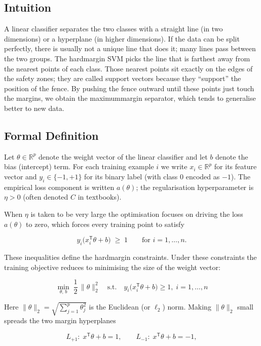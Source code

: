 \documentclass[12pt, a4paper]{article}
\begin{document}
\subsection{Intuition}
A linear classifier separates the two classes with a straight line (in two dimensions) or a hyperplane (in higher dimensions).  If the data can be split perfectly, there is usually not a unique line that does it; many lines pass between the two groups.  The hardmargin SVM picks the line that is farthest away from the nearest points of each class.  Those nearest points sit exactly on the edges of the safety zones; they are called support vectors because they ``support'' the position of the fence.  By pushing the fence outward until these points just touch the margins, we obtain the maximummargin separator, which tends to generalise better to new data.  

\subsection{Formal Definition}
Let \(\theta \in \mathbb{R}^{p}\) denote the weight vector of the linear classifier and let \(b\) denote the bias (intercept) term.  For each training example \(i\) we write \(x_{i}\in\mathbb{R}^{p}\) for its feature vector and \(y_{i}\in\{-1,+1\}\) for its binary label (with class 0 encoded as \(-1\)).  The empirical loss component is written \(a(\theta)\); the regularisation hyperparameter is \(\eta>0\) (often denoted \(C\) in textbooks).  

When \(\eta\) is taken to be very large the optimisation focuses on driving the loss \(a(\theta)\) to zero, which forces every training point to satisfy  

\[
y_{i}\bigl(x_{i}^{\mathsf T}\theta + b\bigr) \;\ge\; 1 \qquad\text{for } i=1,\dots,n .
\]

These inequalities define the hardmargin constraints.  Under these constraints the training objective reduces to minimising the size of the weight vector:

\[
\boxed{\;
\min_{\theta ,\,b}\; \frac{1}{2}\,\|\theta\|_{2}^{2}
\quad\text{s.t.}\quad
y_{i}\bigl(x_{i}^{\mathsf T}\theta + b\bigr) \ge 1,\; i=1,\dots,n
\;}
\]

Here \(\|\theta\|_{2} = \sqrt{\sum_{j=1}^{p}\theta_{j}^{2}}\) is the Euclidean (or \(\ell_{2}\)) norm.  Making \(\|\theta\|_{2}\) small spreads the two margin hyperplanes  

\[
L_{+1}:\; x^{\mathsf T}\theta + b = 1,
\qquad
L_{-1}:\; x^{\mathsf T}\theta + b = -1,
\]
\end{document}
